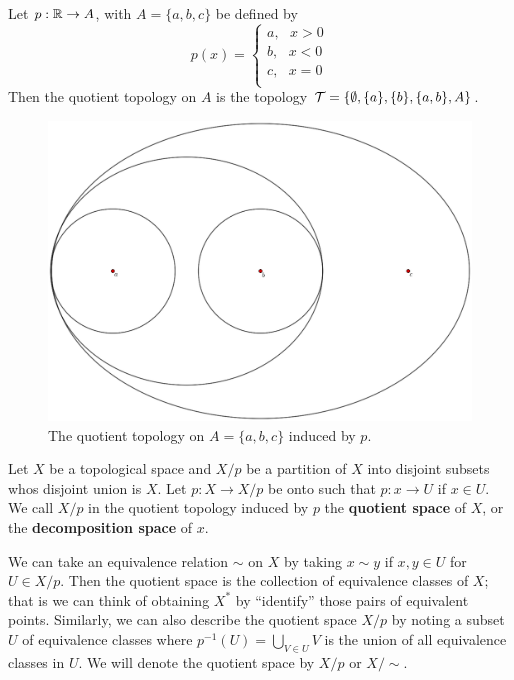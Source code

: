 \begin{example}
    Let $p:\mathbb{R} \rightarrow A$, with  $A=\{a,b,c\}$ be defined by
        \begin{equation*}
            p(x)=\begin{cases}
                    a, \text{ } x>0 \\
                    b, \text{ } x<0 \\
                    c, \text{ } x=0 \\
                \end{cases}
        \end{equation*}
    Then the quotient topology on $A$ is the topology  $\mathcal{T}=\{\emptyset, \{a\}, \{b\}, \{a,b\},A\}$.
    
    \begin{figure}[h] 
        \centering
        \includegraphics[scale = 0.2]{Figures/Chapter2/quotientOnABC.eps}
        \caption{The quotient topology on $A=\{a,b,c\}$ induced by $p$.}
    \end{figure}
\end{example} 

\begin{definition}
    Let $X$ be a topological space and  $X/p$ be a partition of  $X$ into disjoint subsets whos
    disjoint union is  $X$. Let  $p:X \rightarrow X/p$ be onto such that  $p:x \rightarrow U$ if  $x
    \in U$. We call  $X/p$ in the quotient topology induced by $p$ the \textbf{quotient space} of $X$, or the 
    \textbf{decomposition space} of $x$.
\end{definition}

We can take an equivalence relation $\sim$ on  $X$ by taking  $x \sim y$ if  $x,y \in U$ for  $U \in
X/p$. Then the quotient space is the collection of equivalence classes of $X$; that is we can think
of obtaining $X^*$ by ``identify'' those pairs of equivalent points. Similarly, we can also describe
the quotient space $X/p$ by noting a subset $U$ of equivalence classes where $p^{-1}(U)=\bigcup_{V
\in U}{V}$ is the union of all equivalence classes in $U$. We will denote the quotient space by
$X/p$ or  $X/\sim$.

